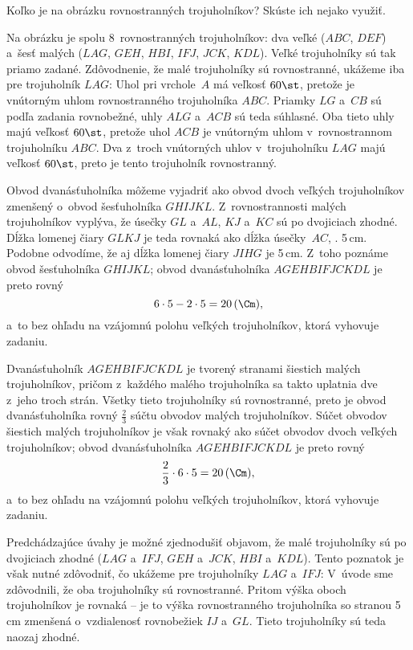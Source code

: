 {%
\napad
Koľko je na obrázku rovnostranných trojuholníkov?
Skúste ich nejako využiť.

\riesenie
Na obrázku je spolu 8~rovnostranných trojuholníkov: dva veľké ($ABC$, $DEF$)
a~šesť malých ($LAG$, $GEH$, $HBI$, $IFJ$, $JCK$, $KDL$).
Veľké trojuholníky sú tak priamo zadané.
Zdôvodnenie, že malé trojuholníky sú rovnostranné, ukážeme iba pre
trojuholník $LAG$:
Uhol pri vrchole~$A$ má veľkosť $60\st$, pretože je vnútorným uhlom
rovnostranného trojuholníka $ABC$.
Priamky $LG$ a~$CB$ sú podľa zadania rovnobežné, uhly $ALG$ a~$ACB$ sú
teda súhlasné.
Oba tieto uhly majú veľkosť $60\st$, pretože uhol $ACB$ je vnútorným
uhlom v~rovnostrannom trojuholníku $ABC$.
Dva z~troch vnútorných uhlov v~trojuholníku $LAG$ majú veľkosť $60\st$, preto je
tento trojuholník rovnostranný.

Obvod dvanásťuholníka môžeme vyjadriť ako obvod dvoch veľkých
trojuholníkov zmenšený o~obvod šesťuholníka $GHIJKL$.
Z~rovnostrannosti malých trojuholníkov vyplýva, že úsečky $GL$ a~$AL$,
$KJ$ a~$KC$ sú po dvojiciach zhodné.
Dĺžka lomenej čiary $GLKJ$ je teda rovnaká ako dĺžka úsečky~$AC$, \tj. 5\,cm.
Podobne odvodíme, že aj dĺžka lomenej čiary $JIHG$ je 5\,cm.
Z~toho poznáme obvod šesťuholníka $GHIJKL$;
obvod dvanásťuholníka $AGEHBIFJCKDL$ je preto rovný
$$
6\cdot5-2\cdot5=20\,(\Cm),
$$
a~to bez ohľadu na vzájomnú polohu veľkých trojuholníkov, ktorá vyhovuje zadaniu.


\ineriesenie
Dvanásťuholník $AGEHBIFJCKDL$ je tvorený stranami šiestich malých trojuholníkov,
pričom z~každého malého trojuholníka sa takto uplatnia dve z~jeho troch strán.
Všetky tieto trojuholníky sú rovnostranné, preto je obvod dvanásťuholníka
rovný $\frac23$ súčtu obvodov malých trojuholníkov.
Súčet obvodov šiestich malých trojuholníkov je však rovnaký ako súčet obvodov dvoch
veľkých trojuholníkov;
obvod dvanásťuholníka $AGEHBIFJCKDL$ je preto rovný
$$
\frac23\cdot6\cdot5=20\,(\Cm),
$$
a~to bez ohľadu na vzájomnú polohu veľkých trojuholníkov, ktorá vyhovuje zadaniu.

\poznamky
Predchádzajúce úvahy je možné zjednodušiť objavom, že malé trojuholníky sú po
dvojiciach zhodné ($LAG$ a~$IFJ$, $GEH$ a~$JCK$, $HBI$ a~$KDL$).
Tento poznatok je však nutné zdôvodniť, čo ukážeme pre trojuholníky
$LAG$ a~$IFJ$:
V~úvode sme zdôvodnili, že oba trojuholníky sú rovnostranné.
Pritom výška oboch trojuholníkov je rovnaká -- je to výška rovnostranného
trojuholníka so stranou 5\,cm zmenšená o~vzdialenosť rovnobežiek $IJ$ a~$GL$.
Tieto trojuholníky sú teda naozaj zhodné.
}

